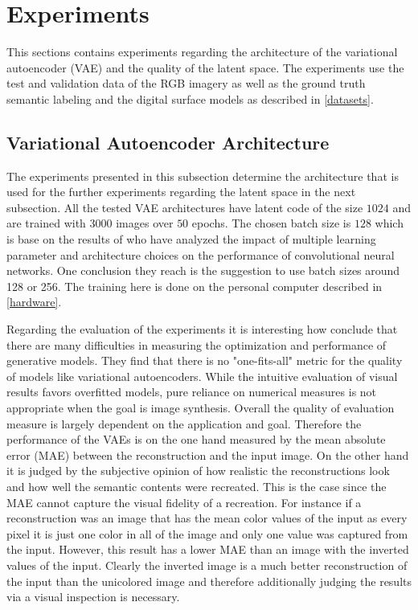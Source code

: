 \section{Experiments}

This sections contains experiments regarding the architecture of the variational autoencoder (VAE)
and the quality of the latent space. The experiments use the test and validation data of the RGB
imagery as well as the ground truth semantic labeling and the digital surface models as described in
\autoref{datasets}.

\subsection{Variational Autoencoder Architecture} \label{architecture_experiments}

The experiments presented in this subsection determine the architecture that is used for the further
experiments regarding the latent space in the next subsection. All the tested VAE architectures have 
latent code of the size $1024$ and are trained with $3000$ images over $50$ epochs.
The chosen batch size is $128$ which is base on the results of \textcite{2016-mishkin-systematic} who have analyzed
the impact of multiple learning parameter and architecture choices on the performance of convolutional neural networks.
One conclusion they reach is the suggestion to use batch sizes around 128 or 256.
The training here is done on the personal computer described in \autoref{hardware}.


Regarding the evaluation of the experiments it is interesting how \textcite{2015-theis-generative}
conclude that there are many difficulties in
measuring the optimization and performance of generative models. They find that there is no 
"one-fits-all" metric for the quality of models like variational autoencoders. While the intuitive evaluation
of visual results favors overfitted models, pure reliance on numerical measures is not appropriate when the
goal is image synthesis. Overall the quality of evaluation measure is largely dependent on the application
and goal.
Therefore the performance of the VAEs is on the one hand measured by the mean absolute error (MAE)
between the reconstruction and the input image.
On the other hand it is judged by the subjective opinion of how realistic the reconstructions look and how well
the semantic contents were recreated. This is the case since the MAE 
cannot capture the visual fidelity of a recreation. For instance if a reconstruction was an image that has the mean
color values of the input as every pixel it is just one color in all of the image and only one value was captured
from the input. However, this result has a lower MAE than an image with the inverted values of the
input. Clearly the inverted image is a much better reconstruction of the input than the unicolored image and therefore
additionally judging the results via a visual inspection is necessary.

